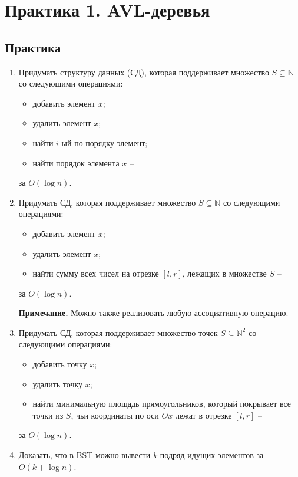 \section{Практика 1. AVL-деревья}

\subsection{Практика}

\begin{enumerate}
  \item Придумать структуру данных (СД), которая поддерживает множество $S
\subseteq \mathbb{N}$ со следующими операциями:
    \begin{itemize}
      \item добавить элемент $x$;
      \item удалить элемент $x$;
      \item найти $i$-ый по порядку элемент;
      \item найти порядок элемента $x$ --
    \end{itemize}  
    за $O(\log n)$.

  \item Придумать СД, которая поддерживает множество $S \subseteq \mathbb{N}$ со
следующими операциями: 
    \begin{itemize}
      \item добавить элемент $x$;
      \item удалить элемент $x$;
      \item найти сумму всех чисел на отрезке $[l, r]$, лежащих в множестве $S$ --
    \end{itemize}  
    за $O(\log n)$.
    
   \textbf{Примечание.} Можно также реализовать любую ассоциативную операцию.    


  \item Придумать СД, которая поддерживает множество точек $S \subseteq
\mathbb{N}^2$ со следующими операциями: 
    \begin{itemize}
      \item добавить точку $x$;
      \item удалить точку $x$;
      \item найти минимальную площадь прямоугольников, который покрывает все
точки из $S$, чьи координаты по оси $Ox$ лежат в отрезке $[l, r]$ --
\end{itemize}
    за $O(\log n)$.

  \item Доказать, что в BST можно вывести $k$ подряд идущих элементов за $O(k +
\log n)$.

\end{enumerate}

